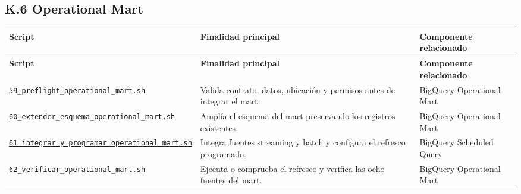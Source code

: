 \documentclass[11pt]{article}
\begin{document}
\subsection*{K.6 Operational Mart}
\begingroup\scriptsize
\begin{longtable}{@{}>{\raggedright\arraybackslash}p{}>{\raggedright\arraybackslash}p{}>{\raggedright\arraybackslash}p{}@{}}
\toprule
\textbf{Script} & \textbf{Finalidad principal} & \textbf{Componente relacionado} \\
\midrule
\endfirsthead
\toprule
\textbf{Script} & \textbf{Finalidad principal} & \textbf{Componente relacionado} \\
\midrule
\endhead
\href{https://github.com/Codenid/lumina-retail-data-platform/blob/main/implementation/automatizacion/scripts59_preflight_operational_mart.sh}{\texttt{59\_\allowbreak{}preflight\_\allowbreak{}operational\_\allowbreak{}mart.sh}} & Valida contrato, datos, ubicación y permisos antes de integrar el mart. & BigQuery Operational Mart \\
\href{https://github.com/Codenid/lumina-retail-data-platform/blob/main/implementation/automatizacion/scripts60_extender_esquema_operational_mart.sh}{\texttt{60\_\allowbreak{}extender\_\allowbreak{}esquema\_\allowbreak{}operational\_\allowbreak{}mart.sh}} & Amplía el esquema del mart preservando los registros existentes. & BigQuery Operational Mart \\
\href{https://github.com/Codenid/lumina-retail-data-platform/blob/main/implementation/automatizacion/scripts61_integrar_y_programar_operational_mart.sh}{\texttt{61\_\allowbreak{}integrar\_\allowbreak{}y\_\allowbreak{}programar\_\allowbreak{}operational\_\allowbreak{}mart.sh}} & Integra fuentes streaming y batch y configura el refresco programado. & BigQuery Scheduled Query \\
\href{https://github.com/Codenid/lumina-retail-data-platform/blob/main/implementation/automatizacion/scripts62_verificar_operational_mart.sh}{\texttt{62\_\allowbreak{}verificar\_\allowbreak{}operational\_\allowbreak{}mart.sh}} & Ejecuta o comprueba el refresco y verifica las ocho fuentes del mart. & BigQuery Operational Mart \\
\bottomrule
\end{longtable}
\endgroup
\end{document}
